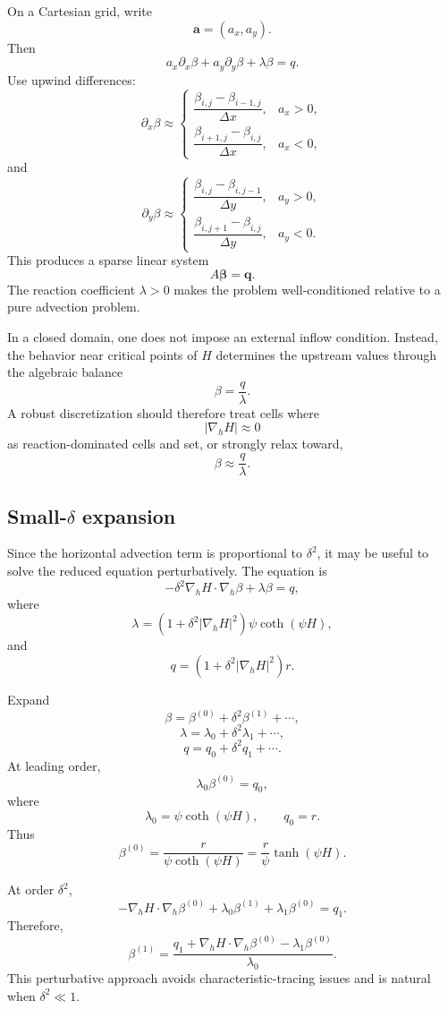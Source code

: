\documentclass[11pt]{amsart}
\begin{document}
On a Cartesian grid, write
\[
\mathbf{a}=(a_x,a_y).
\]
Then
\[
a_x\partial_x\beta+a_y\partial_y\beta+\lambda\beta=q.
\]
Use upwind differences:
\[
\partial_x\beta\approx
\begin{cases}
\dfrac{\beta_{i,j}-\beta_{i-1,j}}{\Delta x}, & a_x>0,\\[10pt]
\dfrac{\beta_{i+1,j}-\beta_{i,j}}{\Delta x}, & a_x<0,
\end{cases}
\]
and
\[
\partial_y\beta\approx
\begin{cases}
\dfrac{\beta_{i,j}-\beta_{i,j-1}}{\Delta y}, & a_y>0,\\[10pt]
\dfrac{\beta_{i,j+1}-\beta_{i,j}}{\Delta y}, & a_y<0.
\end{cases}
\]
This produces a sparse linear system
\[
A\boldsymbol{\beta}=\mathbf{q}.
\]
The reaction coefficient \(\lambda>0\) makes the problem well-conditioned
relative to a pure advection problem.

In a closed domain, one does not impose an external inflow condition. Instead,
the behavior near critical points of \(H\) determines the upstream values
through the algebraic balance
\[
\beta=\frac{q}{\lambda}.
\]
A robust discretization should therefore treat cells where
\[
|\nabla_h H|\approx 0
\]
as reaction-dominated cells and set, or strongly relax toward,
\[
\beta\approx \frac{q}{\lambda}.
\]

\subsection{Small-$\delta$ expansion}

Since the horizontal advection term is proportional to \(\delta^2\), it may be
useful to solve the reduced equation perturbatively. The equation is
\[
-\delta^2\nabla_h H\cdot\nabla_h\beta+\lambda\beta=q,
\]
where
\[
\lambda=
\left(1+\delta^2|\nabla_h H|^2\right)\psi\coth(\psi H),
\]
and
\[
q=
\left(1+\delta^2|\nabla_h H|^2\right)r.
\]

Expand
\[
\beta=\beta^{(0)}+\delta^2\beta^{(1)}+\cdots,
\]
\[
\lambda=\lambda_0+\delta^2\lambda_1+\cdots,
\]
\[
q=q_0+\delta^2 q_1+\cdots.
\]
At leading order,
\[
\lambda_0\beta^{(0)}=q_0,
\]
where
\[
\lambda_0=\psi\coth(\psi H),
\qquad
q_0=r.
\]
Thus
\[
\boxed{
\beta^{(0)}
=
\frac{r}{\psi\coth(\psi H)}
=
\frac{r}{\psi}\tanh(\psi H).
}
\]

At order \(\delta^2\),
\[
-\nabla_h H\cdot\nabla_h\beta^{(0)}
+\lambda_0\beta^{(1)}
+\lambda_1\beta^{(0)}
=
q_1.
\]
Therefore,
\[
\boxed{
\beta^{(1)}
=
\frac{
q_1
+
\nabla_h H\cdot\nabla_h\beta^{(0)}
-
\lambda_1\beta^{(0)}
}{
\lambda_0
}.
}
\]
This perturbative approach avoids characteristic-tracing issues and is natural
when \(\delta^2\ll 1\).
\end{document}
